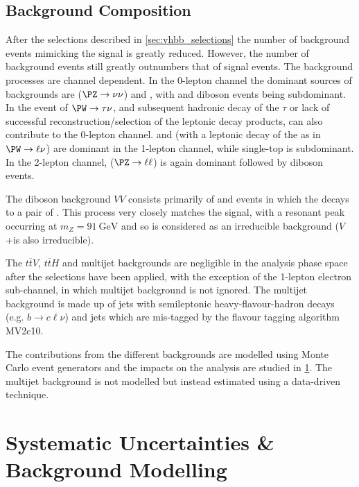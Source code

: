 \subsection{Background Composition}\label{sec:vebb_background_composition}

After the selections described in \cref{sec:vhbb_selections} the number of background events mimicking the \VHbb signal is greatly reduced.
However, the number of background events still greatly outnumbers that of signal events.
The background processes are channel dependent.
In the 0-lepton channel the dominant sources of backgrounds are \Zjets ($\Zboson \to \nu\nu$) and \ttbar, with \Wjets and diboson events being subdominant.
In the event of $\Wboson \to \tau\nu$, and subsequent hadronic decay of the $\tau$ or lack of successful reconstruction/selection of the leptonic decay products, \Wjets can also contribute to the 0-lepton channel.
\ttbar and \Wjets (with a leptonic decay of the \Wboson as in $\Wboson \to \ell\nu$) are dominant in the 1-lepton channel, while single-top is subdominant.
In the 2-lepton channel, \Zjets ($\Zboson \to \ell\ell$) is again dominant followed by \Zboson\Zboson diboson events.

The diboson background $VV$ consists primarily of \Wboson\Zboson and \Zboson\Zboson events in which the \Zboson decays to a pair of \bquarks.
This process very closely matches the signal, with a resonant peak occurring at $m_Z = \SI{91}{\GeV}$ and so is considered as an 
irreducible background ($V$+\bjets is also irreducible).

The $t\overline{t} V$, $t\overline{t} H$ and multijet backgrounds are negligible in the analysis phase space after the selections have been applied, with the exception of the 1-lepton electron sub-channel, in which multijet background is not ignored.
The multijet background is made up of jets with semileptonic heavy-flavour-hadron decays (e.g. $b \to c \ell \nu$) and jets which are mis-tagged by the flavour tagging algorithm MV2c10.

The contributions from the different backgrounds are modelled using Monte Carlo event generators and the impacts on the analysis are studied in \cref{sec:vhbb_modelling}.
The multijet background is not modelled but instead estimated using a data-driven technique.


\section{Systematic Uncertainties \& Background Modelling}\label{sec:vhbb_modelling}

